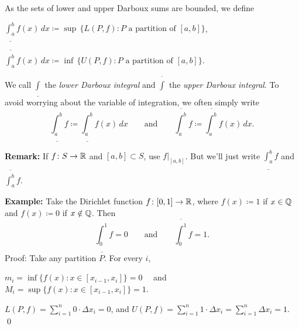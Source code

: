 \documentclass[10pt,aspectratio=169]{beamer}
\begin{document}
\begin{frame}

\begin{definition}
As the sets of lower and upper Darboux sums are bounded, we define

\pause
\medskip

\qquad
$\displaystyle
\underline{\int_a^b} f(x)\,dx \coloneqq
\sup \, \bigl\{ L(P,f) : P \text{ a partition of } [a,b] \bigr\}$,

\pause
\bigskip

\qquad
$\displaystyle
\overline{\int_a^b} f(x)\,dx \coloneqq
\inf \, \bigl\{ U(P,f) : P \text{ a partition of } [a,b] \bigr\}$.

\pause
\medskip

We call $\underline{\int}$
the \emph{lower Darboux integral} and
$\overline{\int}$
the \emph{upper Darboux integral}.
\pause
To avoid worrying about the variable of integration, 
we often simply write
\begin{equation*}
\underline{\int_a^b} f \coloneqq
\underline{\int_a^b} f(x)\,dx 
\qquad \text{and} \qquad
\overline{\int_a^b} f \coloneqq
\overline{\int_a^b} f(x)\,dx  .
\end{equation*}
\end{definition}

\pause
\textbf{Remark:}
If $f \colon S \to {\mathbb{R}}$ and $[a,b] \subset S$,
use $f|_{[a,b]}$.  But we'll just write
$\underline{\int_a^b} f$ and
$\overline{\int_a^b} f$.

\end{frame}

\begin{frame}

\textbf{Example:}
Take the Dirichlet function
$f \colon [0,1] \to {\mathbb{R}}$, where $f(x) \coloneqq 1$ if
$x \in {\mathbb{Q}}$ and $f(x) \coloneqq 0$ if $x \notin {\mathbb{Q}}$.
\pause
Then
\begin{equation*}
\underline{\int_0^1} f = 0 \qquad \text{and} \qquad
\overline{\int_0^1} f = 1 .
\end{equation*}
\pause
Proof: Take any partition $P$.
\pause
For every $i$,

$m_i = \inf \bigl\{ f(x) : x \in [x_{i-1},x_i] \bigr\} = 0$~~
\pause
and
~~$M_i = \sup \bigl\{ f(x) : x \in [x_{i-1},x_i] \bigr\} = 1$.

\pause
\medskip

\thus \quad
$\displaystyle
L(P,f) = \sum_{i=1}^n 0 \cdot \Delta x_i = 0$,
\pause
\quad and \quad
$\displaystyle
U(P,f) = \sum_{i=1}^n 1 \cdot \Delta x_i = \sum_{i=1}^n \Delta x_i = 1$.
\qed

\end{frame}
\end{document}
